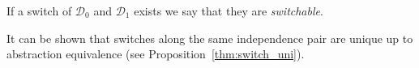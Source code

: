 \documentclass[a4paper,UKenglish,cleveref,pdftex,thm-restate,numberwithinsect]{lipics-v2021}
\def\G{\textbf {\textup{G}}}
\newcommand{\dder}[1]{\mathscr{#1}}
\newcommand{\der}[1]{\underline{\dder{#1}}}
\begin{document}
\begin{definition}[Switch]
  If a switch of $\dder{D}_0$ and $\dder{D}_1$ exists we say that
  they are \emph{switchable}.



\end{definition}

It can be shown that switches along the same independence pair are unique up to abstraction
equivalence (see Proposition~\ref{thm:switch_uni}).
\end{document}
